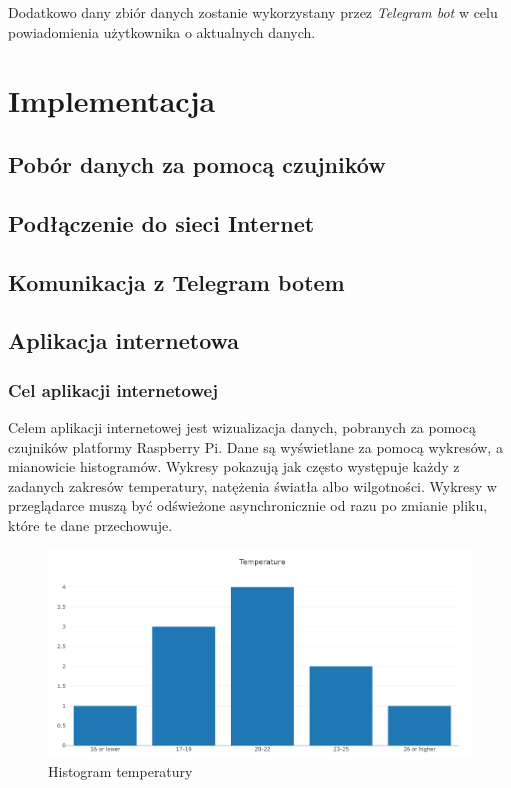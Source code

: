 \documentclass[a4paper]{article}
\begin{document}
	Dodatkowo dany zbiór danych zostanie wykorzystany przez \textit{Telegram bot}
	w celu powiadomienia użytkownika o aktualnych danych.

\section{Implementacja}
    \subsection{Pobór danych za pomocą czujników}
    \subsection{Podłączenie do sieci Internet}
    \subsection{Komunikacja z Telegram botem}
    \subsection{Aplikacja internetowa}

    \subsubsection{Cel aplikacji internetowej}
        Celem aplikacji internetowej jest wizualizacja danych, pobranych za pomocą czujników platformy Raspberry Pi. Dane są wyświetlane za pomocą wykresów, a mianowicie histogramów. Wykresy pokazują jak często występuje każdy z zadanych zakresów temperatury, natężenia światła albo wilgotności. Wykresy w przeglądarce muszą być odświeżone asynchronicznie od razu po zmianie pliku, które te dane przechowuje.
        
        \begin{figure}[H]
            \centering
            \includegraphics[scale=0.4]{exampleChart}
            \caption{Histogram temperatury}
        \end{figure}
        
\end{document}

